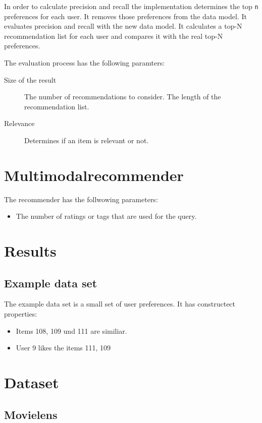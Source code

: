 \documentclass[twoside,a4paper]{article}
\begin{document}
In order to calculate precision and recall the implementation determines the top \verb|n| preferences for each user. It removes those preferences from the data model. It evaluates precision and recall with the new data model. It calculates a top-N recommendation list for each user and compares it with the real top-N preferences.

The evaluation process has the following paramters:
\begin{description}
\item[Size of the result] The number of recommendations to consider. The length of the recommendation list.
\item[Relevance] Determines if an item is relevant or not.
\end{description}

\section{Multimodalrecommender}
\label{sec:multimodalrecommender}

The recommender has the follwowing parameters:
\begin{itemize}
\item The number of ratings or tags that are used for the query.
\end{itemize}

\section{Results}
\label{sec:results}


\subsection{Example data set}
\label{sec:exampledataset}

The example data set is a small set of user preferences. It has constructect properties:
\begin{itemize}
\item Items 108, 109 und 111 are similiar.
\item User 9 likes the items 111, 109 

\end{itemize}

\section{Dataset}
\label{sec:dataset}

\subsection{Movielens}
\label{sec:movielens}
\end{document}
